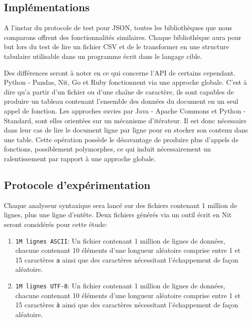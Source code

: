 \subsection{Implémentations}

A l'instar du protocole de test pour JSON, toutes les bibliothèques que nous comparons offrent des
fonctionnalités similaires.
Chaque bibliothèque aura pour but lors du test de lire un fichier CSV et de le transformer en une structure
tabulaire utilisable dans un programme écrit dans le langage cible.

Des différences seront à noter en ce qui concerne l'API de certains cependant. Python - Pandas, Nit, Go et Ruby
fonctionnent via une approche globale.
C'est à dire qu'a partir d'un fichier ou d'une chaîne de caractère, ils sont
capables de produire un tableau contenant l'ensemble des données du document en un seul appel de fonction.
Les approches suvies par Java - Apache Commons et Python - Standard, sont elles orientées sur un mécanisme
d'itérateur.
Il est donc nécessaire dans leur cas de lire le document ligne par ligne pour en stocker son contenu dans une
table.
Cette opération possède le désavantage de produire plus d'appels de fonctions, possiblement polymorphes,
ce qui induit nécessairement un ralentissement par rapport à une approche globale.

\subsection{Protocole d'expérimentation}

Chaque analyseur syntaxique sera lancé sur des fichiers contenant 1 million de lignes, plus une
ligne d'entête.
Deux fichiers générés via un outil écrit en Nit seront considérés pour cette étude:

\begin{enumerate}
	\item \texttt{1M lignes ASCII}: Un fichier contenant 1 million de lignes de données, chacune contenant 10 éléments d'une longueur aléatoire comprise entre 1 et 15 caractères \texttt{a} ainsi que des caractères nécessitant l'échappement de façon aléatoire.
	\item \texttt{1M lignes UTF-8}: Un fichier contenant 1 million de lignes de données, chacune contenant 10 éléments d'une longueur aléatoire comprise entre 1 et 15 caractères \texttt{à} ainsi que des caractères nécessitant l'échappement de façon aléatoire.
\end{enumerate}

